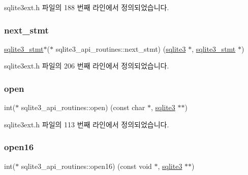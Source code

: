 sqlite3ext.\+h 파일의 188 번째 라인에서 정의되었습니다.

\mbox{\label{structsqlite3__api__routines_ae88d1fe5cf6fe9da1c8dcff08aa642b1}} 
\subsubsection{\texorpdfstring{next\+\_\+stmt}{next\_stmt}}
{\footnotesize\ttfamily \hyperlink{sqlite3_8h_af2a033da1327cdd77f0a174a09aedd0c}{sqlite3\+\_\+stmt}$\ast$($\ast$ sqlite3\+\_\+api\+\_\+routines\+::next\+\_\+stmt) (\hyperlink{sqlite3_8h_a0ef6f2646262c8a9b24368d8ac140f69}{sqlite3} $\ast$, \hyperlink{sqlite3_8h_af2a033da1327cdd77f0a174a09aedd0c}{sqlite3\+\_\+stmt} $\ast$)}



sqlite3ext.\+h 파일의 206 번째 라인에서 정의되었습니다.

\mbox{\label{structsqlite3__api__routines_acc0adb13d6e87651add47577dd57e997}} 
\subsubsection{\texorpdfstring{open}{open}}
{\footnotesize\ttfamily int($\ast$ sqlite3\+\_\+api\+\_\+routines\+::open) (const char $\ast$, \hyperlink{sqlite3_8h_a0ef6f2646262c8a9b24368d8ac140f69}{sqlite3} $\ast$$\ast$)}



sqlite3ext.\+h 파일의 113 번째 라인에서 정의되었습니다.

\mbox{\label{structsqlite3__api__routines_a58d3ff1185d4aae08c6be2b71c4a2e23}} 
\subsubsection{\texorpdfstring{open16}{open16}}
{\footnotesize\ttfamily int($\ast$ sqlite3\+\_\+api\+\_\+routines\+::open16) (const void $\ast$, \hyperlink{sqlite3_8h_a0ef6f2646262c8a9b24368d8ac140f69}{sqlite3} $\ast$$\ast$)}



